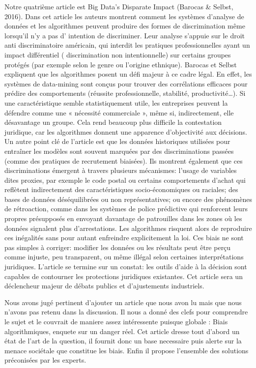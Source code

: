 \documentclass{article}
\begin{document}
Notre quatrième article est Big Data’s Disparate Impact\citep{BarocasSelbst2016} (Barocas \& Selbst, 2016). Dans cet article les auteurs montrent comment les systèmes d’analyse de données et les algorithmes peuvent produire des formes de discrimination même lorsqu’il n’y a pas d’ intention de discriminer. Leur analyse s’appuie sur le droit anti discriminatoire américain, qui interdit les pratiques professionnelles ayant un impact différentiel ( discrimination non intentionnelle) sur certains groupes protégés (par exemple selon le genre ou l’origine ethnique). Barocas et Selbst expliquent que les algorithmes posent un défi majeur à ce cadre légal. En effet, les systèmes de data-mining sont conçus pour trouver des corrélations efficaces pour prédire des comportements (réussite professionnelle, stabilité, productivité…). Si une caractéristique semble statistiquement utile, les entreprises peuvent la défendre comme une « nécessité commerciale », même si, indirectement, elle désavantage un groupe. Cela rend beaucoup plus difficile la contestation juridique, car les algorithmes donnent une apparence d’objectivité aux décisions. Un autre point clé de l’article est que les données historiques utilisées pour entraîner les modèles sont souvent marquées par des discriminations passées (comme des pratiques de recrutement biaisées). Ils montrent également que ces discriminations émergent à travers plusieurs mécanismes: l’usage de variables dites proxies, par exemple le code postal ou certains comportements d’achat qui reflètent indirectement des caractéristiques socio-économiques ou raciales; des bases de données déséquilibrées ou non représentatives; ou encore des phénomènes de rétroaction, comme dans les systèmes de police prédictive qui renforcent leurs propres présupposés en envoyant davantage de patrouilles dans les zones où les données signalent plus d’arrestations. Les algorithmes risquent alors de reproduire ces inégalités sans pour autant enfreindre explicitement la loi. Ces biais ne sont pas simples à corriger: modifier les données ou les résultats peut être perçu comme injuste, peu transparent, ou même illégal selon certaines interprétations juridiques. L’article se termine sur un constat: les outils d’aide à la décision sont capables de contourner les protections juridiques existantes. Cet article sera un déclencheur majeur de débats publics et d’ajustements industriels.

Nous avons jugé pertinent d'ajouter un article que nous avon lu mais que nous n'avons pas retenu dans la discussion. Il nous a donné des clefs pour comprendre le sujet et le couvrait de maniere assez intéressente puisque globale : Biais algorithmiques, enquete sur un danger réel. Cet article dresse tout d'abord un état de l'art de la question, il fournit donc un base necessaire puis alerte sur la menace sociétale que constitue les biais. Enfin il propose l'ensemble des solutions préconisées par les experts.  
\end{document}

